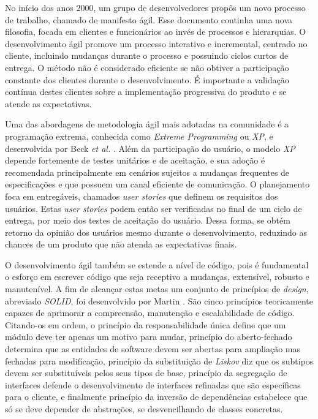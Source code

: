 No início dos anos 2000, um grupo de desenvolvedores propôs um novo processo de trabalho, chamado de manifesto ágil. Esse documento continha uma nova filosofia, focada em clientes e funcionários ao invés de processos e hierarquias. O desenvolvimento ágil promove um processo interativo e incremental, centrado no cliente, incluindo mudanças durante o processo e possuindo ciclos curtos de entrega. O método não é considerado eficiente se não obtiver a participação constante dos clientes durante o desenvolvimento. É importante a validação contínua destes clientes sobre a implementação progressiva do produto e se atende as expectativas.

Uma das abordagens de metodologia ágil mais adotadas na comunidade é a programação extrema, conhecida como \emph{Extreme Programming} ou \emph{XP}, e desenvolvida por Beck \emph{et al.} \cite{beck1}. Além da participação do usuário, o modelo \emph{XP} depende fortemente de testes unitários e de aceitação, e sua adoção é recomendada principalmente em cenários sujeitos a mudanças frequentes de especificações e que possuem um canal eficiente de comunicação. O planejamento foca em entregáveis, chamados \emph{user stories} que definem os requisitos dos usuários. Estas \emph{user stories} podem então ser verificadas no final de um ciclo de entrega, por meio dos testes de aceitação do usuário. Dessa forma, se obtém retorno da opinião dos usuários mesmo durante o desenvolvimento, reduzindo as chances de um produto que não atenda as expectativas finais.

O desenvolvimento ágil também se estende a nível de código, pois é fundamental o esforço em escrever código que seja receptivo a mudanças, extensível, robusto e manutenível. A fim de alcançar estas metas um conjunto de princípios de \emph{design}, abreviado \emph{SOLID}, foi desenvolvido por Martin \cite{martin}. São cinco princípios teoricamente capazes de aprimorar a compreensão, manutenção e escalabilidade de código. Citando-os em ordem, o princípio da responsabilidade única define que um módulo deve ter apenas um motivo para mudar, princípio do aberto-fechado determina que as entidades de software devem ser abertas para ampliação mas fechadas para modificação, princípio da substituição de \emph{Liskov} diz que os subtipos devem ser substituíveis pelos seus tipos de base, princípio da segregação de interfaces defende o desenvolvimento de interfaces refinadas que são específicas para o cliente, e finalmente princípio da inversão de dependências estabelece que só se deve depender de abstrações, se desvencilhando de classes concretas.

